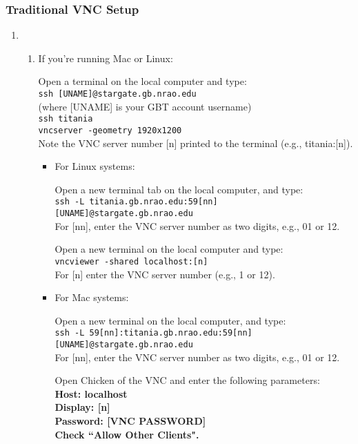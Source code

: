 \documentclass[11pt]{article}
\begin{document}
\subsubsection{Traditional VNC Setup}\label{sssec:old} %
\begin{enumerate}
 \item \begin{enumerate}
  \item\label{st:vnc} %
  If you're running Mac or Linux: 
  
  Open a terminal on the local computer and type: \\
  \indent\texttt{ssh [UNAME]@stargate.gb.nrao.edu} \\ 
  (where [UNAME] is your GBT account username) \\
  {\tt ssh titania \\
  \indent vncserver -geometry 1920x1200} \\
  Note the VNC server number [n] printed to the terminal (e.g., titania:[n]).  
  \begin{itemize}
   \item\label{st:open} %
   For Linux systems: 
   
   Open a new terminal tab on the local computer, and type: \\
   \indent\texttt{ssh -L titania.gb.nrao.edu:59[nn] [UNAME]@stargate.gb.nrao.edu} \\
   For [nn], enter the VNC server number as two digits, e.g., 01 or 12.

   Open a new terminal on the local computer and type: \\
   \texttt{vncviewer -shared localhost:[n]} \\
   For [n] enter the VNC server number (e.g., 1 or 12). 
  
   \item %
   For Mac systems: 
   
   Open a new terminal on the local computer, and type: \\
   \texttt{ssh -L 59[nn]:titania.gb.nrao.edu:59[nn] [UNAME]@stargate.gb.nrao.edu} \\
   For [nn], enter the VNC server number as two digits, e.g., 01 or 12. 

   Open Chicken of the VNC and enter the following parameters: \\
   \textbf{Host: localhost \\
   Display: [n] \\
   Password: [VNC PASSWORD] \\
   Check ``Allow Other Clients". }


\end{itemize}
\end{enumerate}
\end{enumerate}
\end{document}
